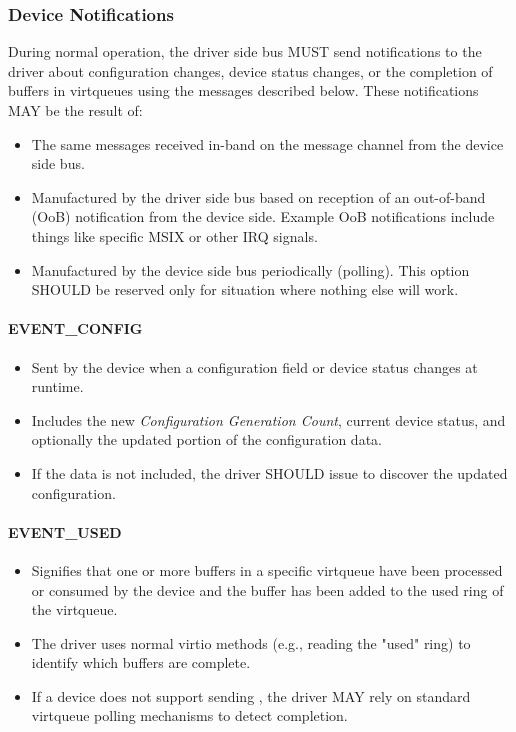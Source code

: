 \subsubsection{Device Notifications}
\label{sec:Virtio Transport Options / Virtio Over Messages / Device Operation / Device Notifications}

During normal operation, the driver side bus MUST send notifications to
the driver about configuration changes, device status changes, or the
completion of buffers in virtqueues using the messages described below.
These notifications MAY be the result of:

\begin{itemize}
    \item The same messages received in-band on the message channel from the
        device side bus.
    \item Manufactured by the driver side bus based on reception of an
        out-of-band (OoB) notification from the device side.  Example OoB
        notifications include things like specific MSIX or other IRQ signals.
    \item Manufactured by the device side bus periodically (polling).
        This option SHOULD be reserved only for situation where nothing else
        will work.
  \end{itemize}

\paragraph{EVENT\_CONFIG}
\begin{itemize}
  \item Sent by the device when a configuration field or device status changes
    at runtime.
  \item Includes the new \emph{Configuration Generation Count}, current device
    status, and optionally the updated portion of the configuration data.
  \item If the data is not included, the driver SHOULD issue
     to discover the updated configuration.
\end{itemize}

\paragraph{EVENT\_USED}
\begin{itemize}
  \item Signifies that one or more buffers in a specific virtqueue have been
    processed or consumed by the device and the buffer has been added to the
    used ring of the virtqueue.
  \item The driver uses normal virtio methods (e.g., reading the "used" ring) to
    identify which buffers are complete.
  \item If a device does not support sending , the driver
     MAY rely on standard virtqueue polling mechanisms to detect
     completion.
\end{itemize}

